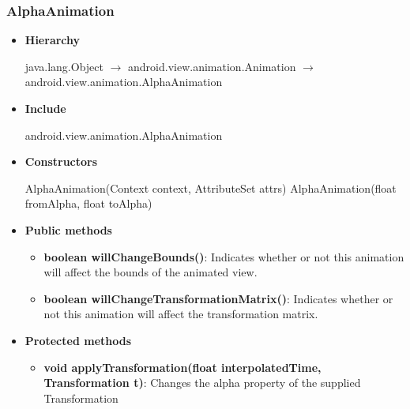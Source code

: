 \documentclass{report}
\begin{document}
    \subsubsection{AlphaAnimation}
    \begin{itemize}
        \item \textbf{Hierarchy}
            \begin{center}
                java.lang.Object $\to$	android.view.animation.Animation $\to$	android.view.animation.AlphaAnimation
            \end{center}
        \item \textbf{Include}
            \bigbreak \noindent 
            \begin{javacode}
                android.view.animation.AlphaAnimation
            \end{javacode}
        \item \textbf{Constructors}
            \bigbreak \noindent 
            \begin{javacode}
                AlphaAnimation(Context context, AttributeSet attrs)
                AlphaAnimation(float fromAlpha, float toAlpha)
            \end{javacode}
        \item \textbf{Public methods}
            \begin{itemize}
                \item \textbf{boolean	willChangeBounds()}: Indicates whether or not this animation will affect the bounds of the animated view.
                \item \textbf{boolean	willChangeTransformationMatrix()}: Indicates whether or not this animation will affect the transformation matrix.
            \end{itemize}
        \item \textbf{Protected methods}
            \begin{itemize}
                \item \textbf{void	applyTransformation(float interpolatedTime, Transformation t)}: Changes the alpha property of the supplied Transformation
            \end{itemize}

    \end{itemize}

    \pagebreak 
\end{document}
